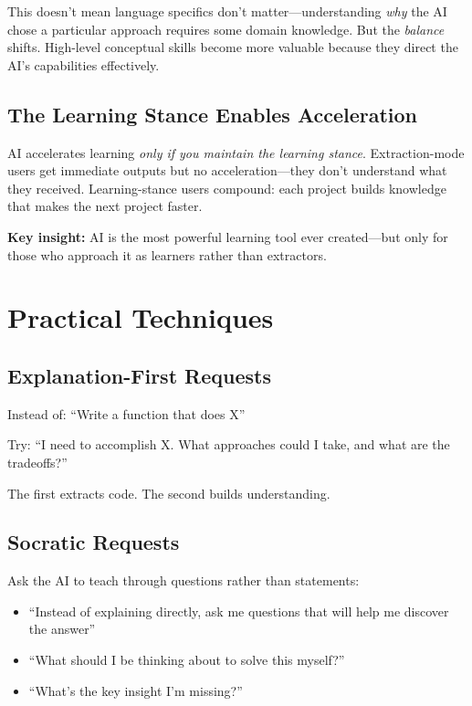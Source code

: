 This doesn't mean language specifics don't matter---understanding \emph{why} the AI chose a particular approach requires some domain knowledge. But the \emph{balance} shifts. High-level conceptual skills become more valuable because they direct the AI's capabilities effectively.

\subsection{The Learning Stance Enables Acceleration}

AI accelerates learning \emph{only if you maintain the learning stance}. Extraction-mode users get immediate outputs but no acceleration---they don't understand what they received. Learning-stance users compound: each project builds knowledge that makes the next project faster.

\begin{quotebox}
\textbf{Key insight:} AI is the most powerful learning tool ever created---but only for those who approach it as learners rather than extractors.
\end{quotebox}

\section{Practical Techniques}

\subsection{Explanation-First Requests}

Instead of: ``Write a function that does X''

Try: ``I need to accomplish X. What approaches could I take, and what are the tradeoffs?''

The first extracts code. The second builds understanding.

\subsection{Socratic Requests}

Ask the AI to teach through questions rather than statements:

\begin{itemize}
    \item ``Instead of explaining directly, ask me questions that will help me discover the answer''
    \item ``What should I be thinking about to solve this myself?''
    \item ``What's the key insight I'm missing?''
\end{itemize}

